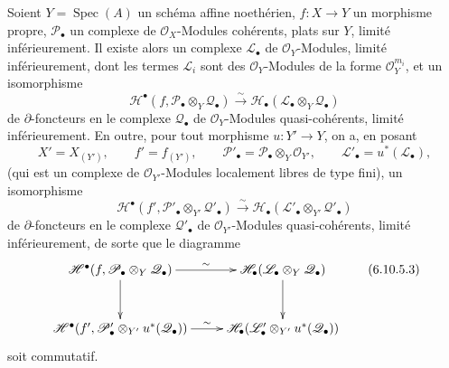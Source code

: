 \begin{theorem}[6.10.5]
Soient $Y=\operatorname{Spec}(A)$ un schéma affine noethérien,
$f:X\to Y$ un morphisme propre, $\mathscr P_\bullet$ un complexe de
$\mathscr O_X$-Modules cohérents, plats sur $Y$, limité inférieurement. Il
existe alors un complexe $\mathscr L_\bullet$ de $\mathscr O_Y$-Modules,
limité inférieurement, dont les termes $\mathscr L_i$ sont des
$\mathscr O_Y$-Modules de la forme $\mathscr O_Y^{m_i}$, et un isomorphisme
\[
  \mathscr H^\bullet
  (f,\mathscr P_\bullet\otimes_Y\mathscr Q_\bullet)
  \xrightarrow{\sim}
  \mathscr H_\bullet
  (\mathscr L_\bullet\otimes_Y\mathscr Q_\bullet)
  \tag{6.10.5.1}\label{III.6.10.5.1.fr}
\]
de $\partial$-foncteurs en le complexe $\mathscr Q_\bullet$ de
$\mathscr O_Y$-Modules quasi-cohérents, limité inférieurement. En outre, pour
tout morphisme $u:Y'\to Y$, on a, en posant
\[
  X'=X_{(Y')},
  \qquad
  f'=f_{(Y')},
  \qquad
  \mathscr P'_\bullet
  =
  \mathscr P_\bullet\otimes_Y\mathscr O_{Y'},
  \qquad
  \mathscr L'_\bullet=u^*(\mathscr L_\bullet),
\]
(qui est un complexe de $\mathscr O_{Y'}$-Modules localement libres de type
fini), un isomorphisme
\[
  \mathscr H^\bullet
  (f',\mathscr P'_\bullet\otimes_{Y'}\mathscr Q'_\bullet)
  \xrightarrow{\sim}
  \mathscr H_\bullet
  (\mathscr L'_\bullet\otimes_{Y'}\mathscr Q'_\bullet)
  \tag{6.10.5.2}\label{III.6.10.5.2.fr}
\]
de $\partial$-foncteurs en le complexe $\mathscr Q'_\bullet$ de
$\mathscr O_{Y'}$-Modules quasi-cohérents, limité inférieurement, de sorte que
le diagramme
\[
\xymatrix@C=25pt@R=30pt{
  \mathscr H^\bullet
  (f,\mathscr P_\bullet\otimes_Y\mathscr Q_\bullet)
  \ar[r]^-{\sim}\ar[d]
  &
  \mathscr H_\bullet
  (\mathscr L_\bullet\otimes_Y\mathscr Q_\bullet)
  \ar[d]
  \\
  \mathscr H^\bullet
  (f',\mathscr P'_\bullet\otimes_{Y'}u^*(\mathscr Q_\bullet))
  \ar[r]^-{\sim}
  &
  \mathscr H_\bullet
  (\mathscr L'_\bullet\otimes_{Y'}u^*(\mathscr Q_\bullet))
}
\tag{6.10.5.3}\label{III.6.10.5.3.fr}
\]
soit commutatif.
\end{theorem}

